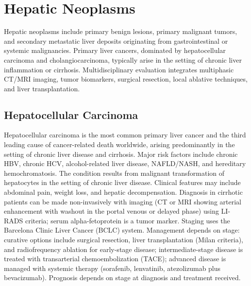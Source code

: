 \section{Hepatic Neoplasms}




Hepatic neoplasms include primary benign lesions, primary malignant tumors, and secondary metastatic liver deposits originating from gastrointestinal or systemic malignancies. Primary liver cancers, dominated by hepatocellular carcinoma and cholangiocarcinoma, typically arise in the setting of chronic liver inflammation or cirrhosis. Multidisciplinary evaluation integrates multiphasic CT/MRI imaging, tumor biomarkers, surgical resection, local ablative techniques, and liver transplantation.





\label{sec:Hepatic Neoplasms}

\subsection{Hepatocellular Carcinoma}
\label{sec:Hepatocellular Carcinoma}
Hepatocellular carcinoma is the most common primary liver cancer and the third leading cause of cancer-related death worldwide, arising predominantly in the setting of chronic liver disease and cirrhosis. Major risk factors include chronic HBV, chronic HCV, alcohol-related liver disease, NAFLD/NASH, and hereditary hemochromatosis. The condition results from malignant transformation of hepatocytes in the setting of chronic liver disease. Clinical features may include abdominal pain, weight loss, and hepatic decompensation. Diagnosis in cirrhotic patients can be made non-invasively with imaging (CT or MRI showing arterial enhancement with washout in the portal venous or delayed phase) using LI-RADS criteria; serum alpha-fetoprotein is a tumor marker. Staging uses the Barcelona Clinic Liver Cancer (BCLC) system. Management depends on stage: curative options include surgical resection, liver transplantation (Milan criteria), and radiofrequency ablation for early-stage disease; intermediate-stage disease is treated with transarterial chemoembolization (TACE); advanced disease is managed with systemic therapy (sorafenib, lenvatinib, atezolizumab plus bevacizumab). Prognosis depends on stage at diagnosis and treatment received.

